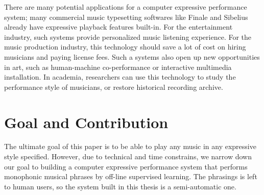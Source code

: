 
There are many potential applications for a computer expressive performance system; many commercial music typesetting softwares like Finale\cite{finale} and Sibelius\cite{sibelius} already have expressive playback features built-in. For the entertainment industry, such systems provide personalized music listening experience. For the music production industry, this technology should save a lot of cost on hiring musicians and paying license fees. Such a systems also open up new opportunities in art, such as human-machine co-performance or interactive multimedia installation. In academia, researchers can use this technology to study the performance style of musicians, or restore historical recording archive.


%



\section{Goal and Contribution}
The ultimate goal of this paper is to be able to play any music in any expressive style specified. However, due to technical and time constrains, we narrow down our goal to building a computer expressive performance system that performs monophonic musical phrases by off-line supervised learning. The phrasings is left to human users, so the system built in this thesis is a semi-automatic one.



